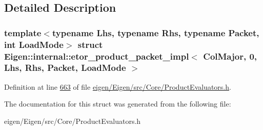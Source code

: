 \subsection{Detailed Description}
\subsubsection*{template$<$typename Lhs, typename Rhs, typename Packet, int Load\+Mode$>$\newline
struct Eigen\+::internal\+::etor\+\_\+product\+\_\+packet\+\_\+impl$<$ Col\+Major, 0, Lhs, Rhs, Packet, Load\+Mode $>$}



Definition at line \hyperlink{eigen_2_eigen_2src_2_core_2_product_evaluators_8h_source_l00663}{663} of file \hyperlink{eigen_2_eigen_2src_2_core_2_product_evaluators_8h_source}{eigen/\+Eigen/src/\+Core/\+Product\+Evaluators.\+h}.



The documentation for this struct was generated from the following file\+:\begin{DoxyCompactItemize}
\item 
eigen/\+Eigen/src/\+Core/\+Product\+Evaluators.\+h\end{DoxyCompactItemize}
